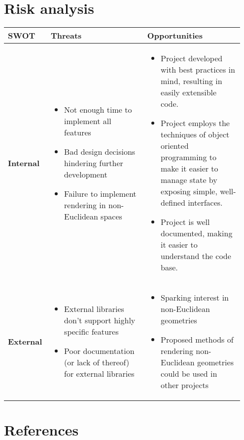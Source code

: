\documentclass[12pt]{article}
\begin{document}
\section{Risk analysis} %

\begin{table}[H]
\centering
\begin{tabular}{|p{0.15\linewidth}|p{0.4\linewidth}|p{0.4\linewidth}|}
\hline
\textbf{SWOT} & \textbf{Threats} & \textbf{Opportunities} \\ \hline
\textbf{Internal} 
& \begin{itemize}
    \itemsep0em 
    \item Not enough time to implement all features
    \item Bad design decisions hindering further development
    \item Failure to implement rendering in non-Euclidean spaces
    \end{itemize}
&
\begin{itemize}
\itemsep0em
    \item Project developed with best practices in mind, resulting in easily extensible code.
    \item Project employs the techniques of object oriented programming to make it easier to manage state by exposing simple, well-defined interfaces.
    \item Project is well documented, making it easier to understand the code base.
\end{itemize}
\\ \hline
\textbf{External} 
& 
\begin{itemize}
    \itemsep0em
    \item External libraries don't support highly specific features
    \item Poor documentation (or lack of thereof) for external libraries
    \end{itemize}
& \begin{itemize} 
    \itemsep0em 
    \item Sparking interest in non-Euclidean geometries 
    \item Proposed methods of rendering non-Euclidean geometries could be used in other projects
  \end{itemize}\\  \hline
\end{tabular} 

\end{table}

\newpage
\section{References}
\printbibliography
\end{document}
